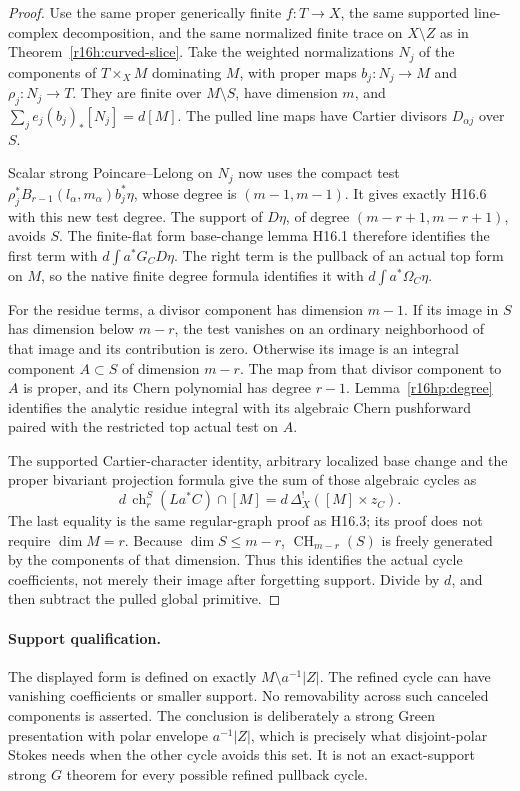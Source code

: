 \begin{proof}
Use the same proper generically finite $f:T\to X$, the same supported
line-complex decomposition, and the same normalized finite trace on
$X\setminus Z$ as in Theorem~\ref{r16h:curved-slice}. Take the weighted
normalizations $N_j$ of the components of $T\times_X M$ dominating
$M$, with proper maps $b_j:N_j\to M$ and $\rho_j:N_j\to T$.
They are finite over $M\setminus S$, have dimension $m$, and
$\sum_j e_j(b_j)_*[N_j]=d[M]$. The pulled line maps have Cartier
divisors $D_{\alpha j}$ over $S$.

Scalar strong Poincare--Lelong on $N_j$ now uses the compact test
$\rho_j^*B_{r-1}(l_\alpha,m_\alpha)b_j^*\eta$, whose degree is
$(m-1,m-1)$. It gives exactly H16.6 with this new test degree.
The support of $D\eta$, of degree $(m-r+1,m-r+1)$, avoids $S$.
The finite-flat form base-change lemma H16.1 therefore identifies
the first term with $d\int a^*G_C D\eta$. The right term is the
pullback of an actual top form on $M$, so the native finite degree
formula identifies it with $d\int a^*\Omega_C\eta$.

For the residue terms, a divisor component has dimension $m-1$.
If its image in $S$ has dimension below $m-r$, the test vanishes
on an ordinary neighborhood of that image and its contribution is
zero. Otherwise its image is an integral component $A\subset S$
of dimension $m-r$. The map from that divisor component to $A$
is proper, and its Chern polynomial has degree $r-1$.
Lemma~\ref{r16hp:degree} identifies the analytic residue integral
with its algebraic Chern pushforward paired with the restricted
top actual test on $A$.

The supported Cartier-character identity, arbitrary localized base
change and the proper bivariant projection formula give the sum
of those algebraic cycles as
\[
 d\,\operatorname{ch}_r^S(La^*C)\cap[M]
                  =d\,\Delta_X^!([M]\times z_C).
\]
The last equality is the same regular-graph proof as H16.3; its
proof does not require $\dim M=r$. Because $\dim S\leq m-r$,
$\operatorname{CH}_{m-r}(S)$ is freely generated by the components
of that dimension. Thus this identifies the actual cycle
coefficients, not merely their image after forgetting support.
Divide by $d$, and then subtract the pulled global primitive.
\end{proof}

\paragraph{Support qualification.}
The displayed form is defined on exactly $M\setminus a^{-1}|Z|$.
The refined cycle can have vanishing coefficients or smaller support.
No removability across such canceled components is asserted. The
conclusion is deliberately a strong Green presentation with polar
envelope $a^{-1}|Z|$, which is precisely what disjoint-polar Stokes
needs when the other cycle avoids this set. It is not an exact-support
strong $G$ theorem for every possible refined pullback cycle.

